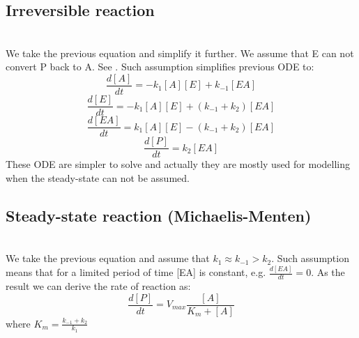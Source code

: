 \documentclass[twoside,twocolumn]{article}
\begin{document}
\subsection{Irreversible reaction}
\label{subsec:enzyme_irreversible}
\\We take the previous equation and simplify it further. We assume that E can not convert P back to A. See \cite[p.~55]{bisswanger_enzyme_2002}. Such assumption simplifies previous ODE to:
\[ \frac{d[A]}{dt} = -k_{1}[A][E] + k_{-1}[EA]\]
\[ \frac{d[E]}{dt} = -k_{1}[A][E] + (k_{-1} + k_{2})[EA]\]
\[ \frac{d[EA]}{dt} = k_{1}[A][E] - (k_{-1} + k_{2})[EA]\]
\[ \frac{d[P]}{dt} = k_{2}[EA]\]
These ODE are simpler to solve and actually they are mostly used for modelling when the steady-state can not be assumed.

\subsection{Steady-state reaction (Michaelis-Menten)}
\label{subsec:enzyme_michaelis}
\\We take the previous equation and assume that $k_{1} \approx k_{-1} > k_{2}$. Such assumption means that for a limited period of time [EA] is constant, e.g. $\frac{d[EA]}{dt}=0$. As the result we can derive\cite[p.~55]{bisswanger_enzyme_2002} the rate of reaction as:
\[ \frac{d[P]}{dt} = V_{max}\frac{[A]}{K_{m} + [A]}\]
where $K_{m}=\frac{k_{-1} + k_{2}}{k_{1}}$
%
{}


\end{document}
